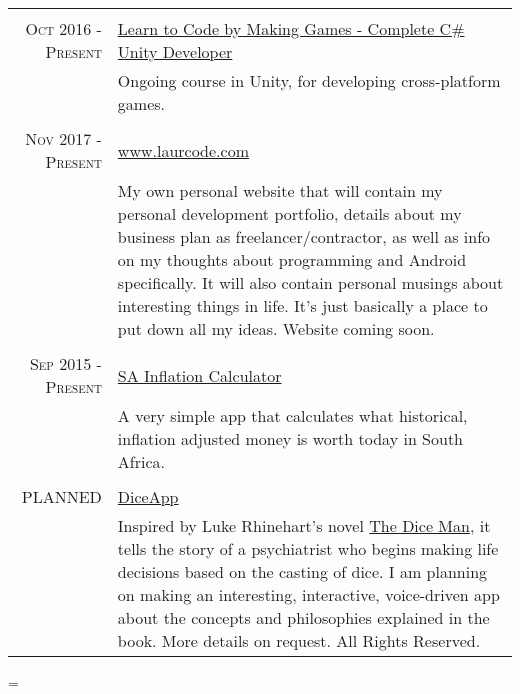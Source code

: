 \documentclass[a4paper,10pt,notitlepage]{article}
\newenvironment{absolutelynopagebreak}
  {\par\nobreak\vfil\penalty0\vfilneg
   \vtop\bgroup}
  {\par\xdef\tpd{\the\prevdepth}\egroup
   \prevdepth=\tpd}
\begin{document}
\begin{absolutelynopagebreak}
\begin{tabular}{r|p{11cm}}
		\multicolumn{2}{c}{} \\
		\textsc{Oct 2016 - Present} & \href{https://www.udemy.com/unitycourse/learn/v4/}{Learn to Code by Making Games - Complete C\# Unity Developer} \\&\footnotesize{Ongoing course in Unity, for developing cross-platform games.} \\
		
		\multicolumn{2}{c}{} \\
		\textsc{Nov 2017 - Present} &                                                                                                                  
		\href{www.laurcode.com}{www.laurcode.com}\\&\footnotesize{My own personal website that will contain my personal development portfolio, details about my business plan as freelancer/contractor, as well as info on my thoughts about programming and Android specifically. It will also contain personal musings about interesting things in life. It's just basically a place to put down all my ideas. Website coming soon.} \\
		
		\multicolumn{2}{c}{} \\
		\textsc{Sep 2015 - Present} &                                                                                                                  
		\href{https://play.google.com/store/apps/details?id=za.co.inflationcalc}{SA Inflation Calculator}\\&\footnotesize{A very simple app that calculates what historical, inflation adjusted money is worth today in South Africa.} \\
		
		\multicolumn{2}{c}{} \\
		\textsc{PLANNED}            &                                                                                                                  
		\href{www.laurcode.com}{DiceApp}\\&\footnotesize{Inspired by Luke Rhinehart’s novel \href{https://en.wikipedia.org/wiki/The_Dice_Man}{The Dice Man}, it tells the story of a psychiatrist who begins making life decisions based on the casting of dice. I am planning on making an interesting, interactive, voice-driven app about the concepts and philosophies explained in the book. More details on request. All Rights Reserved.} \\
		

\end{tabular}
\end{absolutelynopagebreak}
\end{document}
